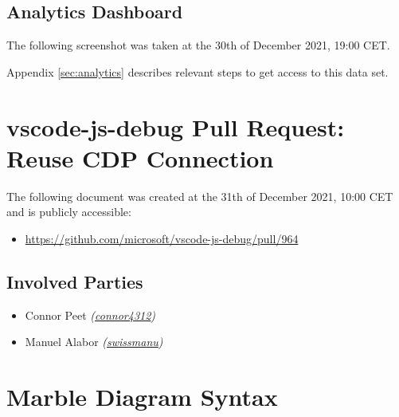 








\subsection{Analytics Dashboard \label{sec:analytics-dashboard}}
The following screenshot was taken at the 30th of December 2021, 19:00 CET.

Appendix \ref{sec:analytics} describes relevant steps to get access to this data set.









\section{vscode-js-debug Pull Request: Reuse CDP Connection \label{sec:cdp-pull-request}}
The following document was created at the 31th of December 2021, 10:00 CET and is publicly accessible:

\begin{itemize}
  \item \url{https://github.com/microsoft/vscode-js-debug/pull/964}
\end{itemize}

\subsection*{Involved Parties}

\begin{itemize}
  \item Connor Peet \emph{(\href{https://github.com/connor4312}{connor4312})}
  \item Manuel Alabor \emph{(\href{https://github.com/swissmanu}{swissmanu})}
\end{itemize}









\section{Marble Diagram Syntax \label{sec:marble-diagram-syntax}}

